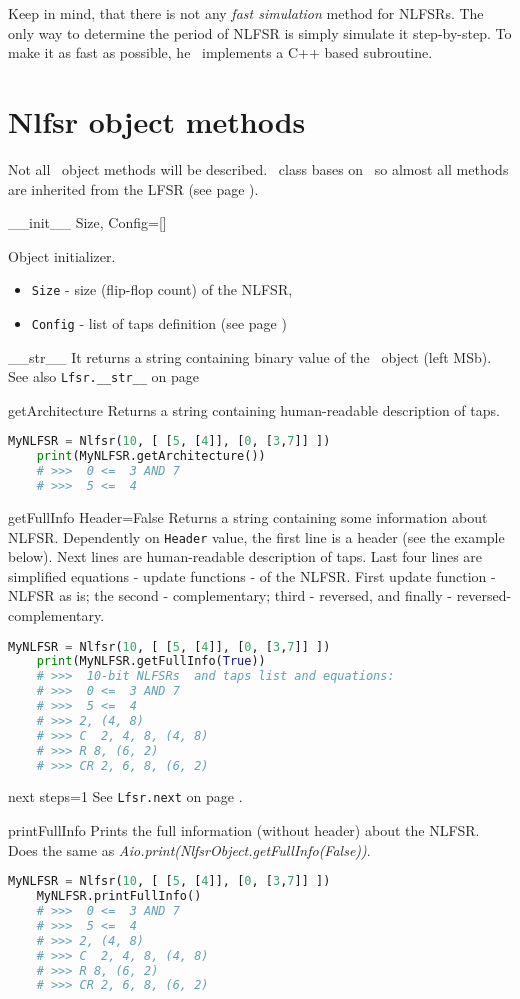Keep in mind, that there is not any \textit{fast simulation} method for NLFSRs. The only way to determine the period of NLFSR is simply simulate it step-by-step. To make it as fast as possible, he \ShellName\ implements a C++ based subroutine.

\section{Nlfsr object methods}

Not all \Nlfsr\ object methods will be described. \Nlfsr\ class bases on \Lfsr\, so almost all methods are inherited from the LFSR (see page \pageref{lfsr:objectmethods}).

 {\_\_init\_\_} {Size, Config=[]} {
	Object initializer.
	\begin{itemize}
		\item \texttt{Size} - size (flip-flop count) of the NLFSR,
		\item \texttt{Config} - list of taps definition (see page \pageref{nlfsr:taps})
	\end{itemize}
}

 {\_\_str\_\_} {} {
	It returns a string containing binary value of the \Nlfsr\ object (left MSb). See also \texttt{Lfsr.\_\_str\_\_} on page \pageref{lfsr:str}
}

 {getArchitecture} {} {
	Returns a string containing human-readable description of taps.
}
\begin{lstlisting}[language=Python]
	MyNLFSR = Nlfsr(10, [ [5, [4]], [0, [3,7]] ])
	print(MyNLFSR.getArchitecture())
	# >>>  0 <=  3 AND 7
	# >>>  5 <=  4
\end{lstlisting}

 {getFullInfo} {Header=False} {
	Returns a string containing some information about NLFSR. Dependently on \texttt{Header} value, the first line is a header (see the example below). Next lines are human-readable description of taps. Last four lines are simplified equations - update functions - of the NLFSR. First update function - NLFSR as is; the second - complementary; third - reversed, and finally - reversed-complementary.
}
\begin{lstlisting}[language=Python]
	MyNLFSR = Nlfsr(10, [ [5, [4]], [0, [3,7]] ])
	print(MyNLFSR.getFullInfo(True))
	# >>>  10-bit NLFSRs  and taps list and equations:
	# >>>  0 <=  3 AND 7
	# >>>  5 <=  4
	# >>> 2, (4, 8)
	# >>> C  2, 4, 8, (4, 8)
	# >>> R 8, (6, 2)
	# >>> CR 2, 6, 8, (6, 2)
\end{lstlisting}

 {next} {steps=1} {
	See \texttt{Lfsr.next} on page \pageref{lfsr:next}.
}

 {printFullInfo} {} {
	Prints the full information (without header) about the NLFSR. Does the same as \textit{Aio.print(NlfsrObject.getFullInfo(False))}.
}
\begin{lstlisting}[language=Python]
	MyNLFSR = Nlfsr(10, [ [5, [4]], [0, [3,7]] ])
	MyNLFSR.printFullInfo()
	# >>>  0 <=  3 AND 7
	# >>>  5 <=  4
	# >>> 2, (4, 8)
	# >>> C  2, 4, 8, (4, 8)
	# >>> R 8, (6, 2)
	# >>> CR 2, 6, 8, (6, 2)
\end{lstlisting}
